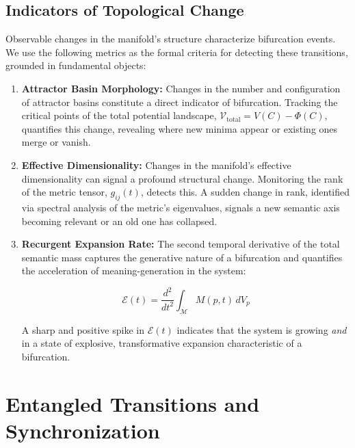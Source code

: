 \subsection{Indicators of Topological Change}
\label{11.3.1:indicators_of_topological_change}

Observable changes in the manifold's structure characterize bifurcation events. We use the following metrics as the formal criteria for detecting these transitions, grounded in fundamental objects:

\begin{enumerate}

    \item \textbf{Attractor Basin Morphology:} Changes in the number and configuration of attractor basins constitute a direct indicator of bifurcation. Tracking the critical points of the total potential landscape, \(\mathcal{V}_{\text{total}} = V(C) - \Phi(C)\), quantifies this change, revealing where new minima appear or existing ones merge or vanish.
    
    \item \textbf{Effective Dimensionality:} Changes in the manifold's effective dimensionality can signal a profound structural change. Monitoring the rank of the metric tensor, \(g_{ij}(t)\), detects this. A sudden change in rank, identified via spectral analysis of the metric's eigenvalues, signals a new semantic axis becoming relevant or an old one has collapsed.
    
    \item \textbf{Recurgent Expansion Rate:} The second temporal derivative of the total semantic mass captures the generative nature of a bifurcation and quantifies the acceleration of meaning-generation in the system:

    \begin{equation}
    \mathcal{E}(t) = \frac{d^2}{dt^2}\int_{\mathcal{M}} M(p,t) \, dV_p
    \end{equation} 
    
    A sharp and positive spike in \(\mathcal{E}(t)\) indicates that the system is growing \textit{and} in a state of explosive, transformative expansion characteristic of a bifurcation.
    
\end{enumerate}


\section{Entangled Transitions and Synchronization}
\label{11.4:entangled_transitions_and_synchronization}

